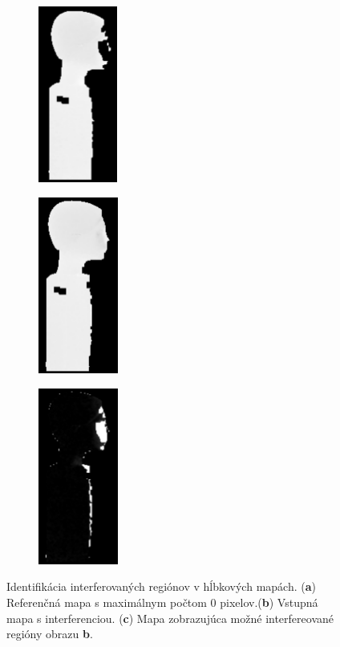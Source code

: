 \begin{figure}[h]
	\centering
	\begin{subfigure}[b]{0.32\textwidth}
		\centering
		\includegraphics[height=5.8cm]{figures/interf_roi_a.png}
		\caption{}
		\label{fig:interf:a}
	\end{subfigure}
	\hskip 0pt
	\begin{subfigure}[b]{0.32\textwidth}
		\centering
		\includegraphics[height=5.8cm]{figures/interf_roi_b.png}
		\caption{}
		\label{fig:interf:b}
	\end{subfigure}
	\hskip 0pt
	\begin{subfigure}[b]{0.32\textwidth}
		\centering
		\includegraphics[height=5.8cm]{figures/interf_roi_c.png}
		\caption{}
		\label{fig:interf:c}
	\end{subfigure}
	\caption{Identifikácia interferovaných regiónov v hĺbkových mapách. (\textbf{a}) Referenčná mapa s maximálnym počtom 0 pixelov.(\textbf{b}) Vstupná mapa s interferenciou. (\textbf{c}) Mapa zobrazujúca možné interfereované regióny obrazu \textbf{b}.}
	\label{fig:interf}
\end{figure}


